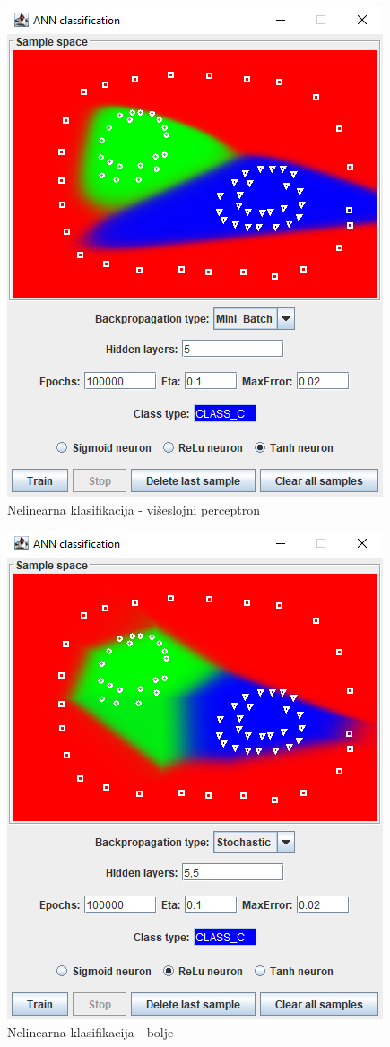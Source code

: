 \documentclass[times, utf8, zavrsni]{fer}
\begin{document}
\begin{figure}[H]
    \centering
    \includegraphics[scale=0.6]{img/tanh-better.png}
    \caption[Caption for LOF]{Nelinearna klasifikacija - višeslojni perceptron}
    \label{fig:tanh-multilayer}
\end{figure}

\begin{figure}[H]
    \centering
    \includegraphics[scale=0.6]{img/relu-better-better.png}
    \caption[Caption for LOF]{Nelinearna klasifikacija - bolje}
    \label{fig:relu-multilayer}
\end{figure}
\end{document}
